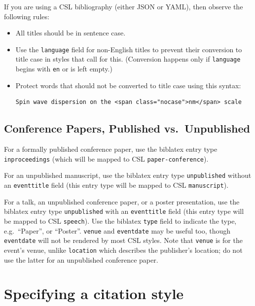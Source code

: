 \documentclass[
  b5paper
]{book}
\begin{document}
If you are using a CSL bibliography (either JSON or YAML), then observe
the following rules:

\begin{itemize}
\item
  All titles should be in sentence case.
\item
  Use the \texttt{language} field for non-English titles to prevent
  their conversion to title case in styles that call for this.
  (Conversion happens only if \texttt{language} begins with \texttt{en}
  or is left empty.)
\item
  Protect words that should not be converted to title case using this
  syntax:

\begin{verbatim}
Spin wave dispersion on the <span class="nocase">nm</span> scale
\end{verbatim}
\end{itemize}

\subsection{Conference Papers, Published
vs.~Unpublished}\label{conference-papers-published-vs.-unpublished}

For a formally published conference paper, use the biblatex entry type
\texttt{inproceedings} (which will be mapped to CSL
\texttt{paper-conference}).

For an unpublished manuscript, use the biblatex entry type
\texttt{unpublished} without an \texttt{eventtitle} field (this entry
type will be mapped to CSL \texttt{manuscript}).

For a talk, an unpublished conference paper, or a poster presentation,
use the biblatex entry type \texttt{unpublished} with an
\texttt{eventtitle} field (this entry type will be mapped to CSL
\texttt{speech}). Use the biblatex \texttt{type} field to indicate the
type, e.g.~``Paper'', or ``Poster''. \texttt{venue} and
\texttt{eventdate} may be useful too, though \texttt{eventdate} will not
be rendered by most CSL styles. Note that \texttt{venue} is for the
event's venue, unlike \texttt{location} which describes the publisher's
location; do not use the latter for an unpublished conference paper.

\section{Specifying a citation style}\label{specifying-a-citation-style}
\end{document}
